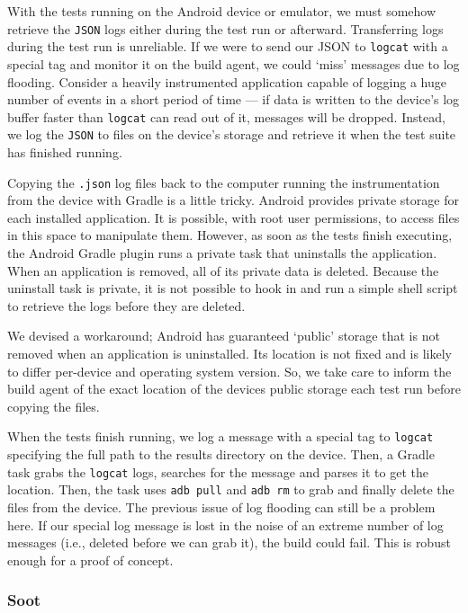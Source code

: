 With the tests running on the Android device or emulator, we must somehow retrieve the {\tt JSON} logs either during the test run or afterward. Transferring logs during the test run is unreliable. If we were to send our JSON to {\tt logcat} with a special tag and monitor it on the build agent, we could {\lq}miss{\rq} messages due to log flooding. Consider a heavily instrumented application capable of logging a huge number of events in a short period of time --- if data is written to the device's log buffer faster than {\tt logcat} can read out of it, messages will be dropped. Instead, we log the {\tt JSON} to files on the device's storage and retrieve it when the test suite has finished running.

Copying the {\tt .json} log files back to the computer running the instrumentation from the device with Gradle is a little tricky. Android provides private storage for each installed application. It is possible, with root user permissions, to access files in this space to manipulate them. However, as soon as the tests finish executing, the Android Gradle plugin runs a private task that uninstalls the application. When an application is removed, all of its private data is deleted. Because the uninstall task is private, it is not possible to hook in and run a simple shell script to retrieve the logs before they are deleted.

We devised a workaround; Android has guaranteed {\lq}public{\rq} storage that is not removed when an application is uninstalled. Its location is not fixed and is likely to differ per-device and operating system version. So, we take care to inform the build agent of the exact location of the devices public storage each test run before copying the files.

When the tests finish running, we log a message with a special tag to {\tt logcat} specifying the full path to the results directory on the device. Then, a Gradle task grabs the {\tt logcat} logs, searches for the message and parses it to get the location. Then, the task uses {\tt adb pull} and {\tt adb rm} to grab and finally delete the files from the device. The previous issue of log flooding can still be a problem here. If our special log message is lost in the noise of an extreme number of log messages (i.e., deleted before we can grab it), the build could fail. This is robust enough for a proof of concept.

\subsubsection{Soot}

